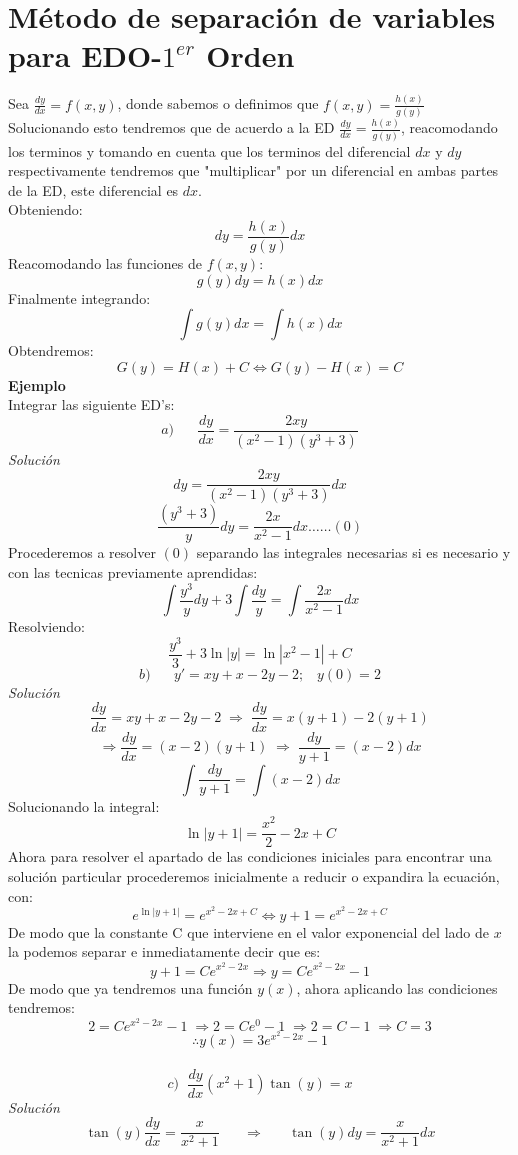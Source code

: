 \documentclass[10pt]{article}
\begin{document}
\section{Método de separación de variables para EDO-$1^{er}$ Orden}
Sea $\frac{dy}{dx}=f(x,y)$, donde sabemos o definimos que $f(x,y)=\frac{h(x)}{g(y)}$\\
Solucionando esto tendremos que de acuerdo a la ED $\frac{dy}{dx}=\frac{h(x)}{g(y)}$, reacomodando los terminos y tomando en cuenta que los terminos del diferencial $dx$ y $dy$ respectivamente tendremos que "multiplicar" por un diferencial en ambas partes de la ED, este diferencial es $dx$.\\
Obteniendo:
\[dy=\frac{h(x)}{g(y)}dx\]
Reacomodando las funciones de $f(x,y)$:
\[g(y)dy=h(x)dx\]
Finalmente integrando:
\[\int g(y)dx=\int h(x)dx\]
Obtendremos:
\[G(y)=H(x)+C \Leftrightarrow G(y)-H(x)=C\]
\textbf{Ejemplo}\\
Integrar las siguiente ED's:
\[a)\;\;\;\;\;\;\frac{dy}{dx}=\frac{2xy}{(x^{2}-1)(y^{3}+3)}\]
\textit{Solución}
\[dy=\frac{2xy}{(x^{2}-1)(y^{3}+3)}dx\]
\[\frac{(y^{3}+3)}{y}dy=\frac{2x}{x^{2}-1}dx \ldots\ldots(0)\]
Procederemos a resolver $(0)$ separando las integrales necesarias si es necesario y con las tecnicas previamente aprendidas:
\[\int\frac{y^{3}}{y}dy+3\int\frac{dy}{y}=\int\frac{2x}{x^{2}-1}dx\]
Resolviendo:
\[\frac{y^{3}}{3}+3\ln\left|y\right|=\ln\left|x^{2}-1\right|+C\]
\clearpage
\[b)\;\;\;\;\;\;y'=xy+x-2y-2;\;\;\;y(0)=2\]
\textit{Solución}
\[\frac{dy}{dx}=xy+x-2y-2 \;\Rightarrow\;\frac{dy}{dx}=x(y+1)-2(y+1)\]
\[\Rightarrow\frac{dy}{dx}=(x-2)(y+1)\;\Rightarrow\;\frac{dy}{y+1}=(x-2)dx\]
\[\int\frac{dy}{y+1}=\int(x-2)dx\]
Solucionando la integral:
\[\ln\left|y+1\right|=\frac{x^{2}}{2}-2x+C\]
Ahora para resolver el apartado de las condiciones iniciales para encontrar una solución particular procederemos inicialmente a reducir o expandira la ecuación, con:
\[e^{\ln|y+1|}=e^{x^{2}-2x+C} \Leftrightarrow y+1=e^{x^{2}-2x+C}\]
De modo que la constante C que interviene en el valor exponencial del lado de $x$ la podemos separar e inmediatamente decir que es:
\[y+1=Ce^{x^{2}-2x}\Rightarrow y=Ce^{x^{2}-2x}-1\]
De modo que ya tendremos una función $y(x)$, ahora aplicando las condiciones tendremos:
\[2=Ce^{x^{2}-2x}-1\;\Rightarrow 2=Ce^{0}-1\;\Rightarrow 2=C-1\;\Rightarrow C=3\]
\[\therefore y(x)=3e^{x^{2}-2x}-1\]
\\\vspace{0.5cm}
\[c)\;\;\frac{dy}{dx}(x^{2}+1)\tan(y)=x\]
\textit{Solución}
\[\tan(y)\frac{dy}{dx}=\frac{x}{x^{2}+1}\;\;\;\;\;\;\Rightarrow\;\;\;\;\;\; \tan(y)dy=\frac{x}{x^{2}+1}dx\]
\end{document}
